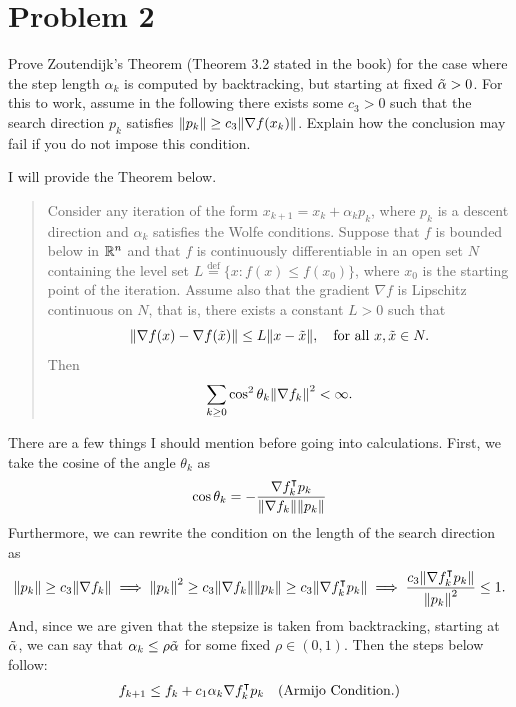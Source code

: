 \newpage
\section{Problem 2}
Prove Zoutendijk's Theorem (Theorem 3.2 stated in the book) for the case where the step length $\alpha_k$ is computed by backtracking, but starting at fixed $\Tilde{\alpha} > 0$. For this to work, assume in the following there exists some $c_3 > 0$ such that the search direction $p_k$ satisfies $\norm{p_k} \geq c_3 \norm{\nabla f(x_k)}$. Explain how the conclusion may fail if you do not impose this condition.
\partbreak
\begin{solution}

    I will provide the Theorem below.
    \tightalignbreak
    \begin{quote}
        Consider any iteration of the form $x_{k+1} = x_k + \alpha_k p_k$, where $p_k$ is a descent direction and $\alpha_k$ satisfies the Wolfe conditions. Suppose that $f$ is bounded below in $\mathbb{R}^n$ and that $f$ is continuously differentiable in an open set $N$ containing the level set $L \stackrel{\text{def}}{=} \{ x : f(x) \leq f(x_0)\}$, where $x_0$ is the starting point of the iteration. Assume also that the gradient $\nabla f$ is Lipschitz continuous on $N$, that is, there exists a constant $L > 0$ such that 
        \[\norm{\nabla f(x) - \nabla f(\Tilde{x})} \leq L\norm{x - \Tilde{x}}, \quad \text{for all } x, \Tilde{x} \in N.\]
        Then
        \[\sum_{k \geq 0} \cos^2\theta_k \norm{\nabla f_k}^2 < \infty.\]
    \end{quote}
    \vspace{-6mm}\alignbreak
    There are a few things I should mention before going into calculations. First, we take the cosine of the angle $\theta_k$ as 
    \[\cos \theta_k = -\frac{\nabla f_k ^\intercal p_k}{\norm{\nabla f_k}\norm{p_k}}\]
    Furthermore, we can rewrite the condition on the length of the search direction as
    \[\norm{p_k} \geq c_3 \norm{\nabla f_k} \implies \norm{p_k}^2 \geq c_3\norm{\nabla f_k}\norm{p_k} \geq c_3\norm{\nabla f_k^\intercal p_k} \implies \frac{c_3\norm{\nabla f_k^\intercal p_k}}{\norm{p_k}^2} \leq 1.\]
    And, since we are given that the stepsize is taken from backtracking, starting at $\Tilde{\alpha}$, we can say that $\alpha_k \leq \rho \Tilde{\alpha}$ for some fixed $\rho \in (0, 1)$.
    Then the steps below follow:
    \tightalignbreak
    \begin{align*}
        f_{k+1} &\leq f_k + c_1\alpha_k\grad f_k\T p_k &\text{(Armijo Condition.)}\\

\end{align*}
\end{solution}
